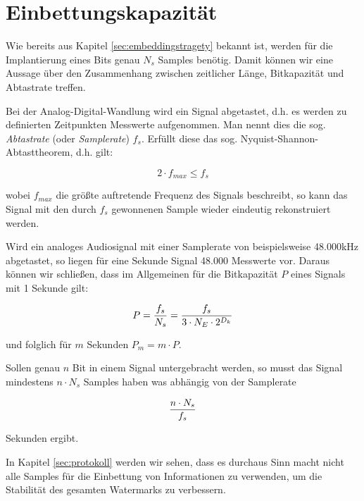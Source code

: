 \section{Einbettungskapazit\"at}
\label{sec:embedding-capacity}

Wie bereits aus Kapitel \ref{sec:embeddingstragety} bekannt ist, werden für die Implantierung eines Bits genau $N_s$ Samples benötig. Damit können wir eine Aussage über den Zusammenhang zwischen zeitlicher Länge, Bitkapazität und Abtastrate treffen. 

Bei der Analog-Digital-Wandlung wird ein Signal abgetastet, d.h. es werden zu definierten Zeitpunkten Messwerte aufgenommen. Man nennt dies die sog. \textit{Abtastrate} (oder \textit{Samplerate}) $f_s$. Erfüllt diese das sog. Nyquist-Shannon-Abtasttheorem\cite{shannon1949communication}, d.h. gilt: 

	 \begin{equation}
		 2 \cdot f_{max} \leq f_s
	 	\label{equ:abtasttheorem}
	 \end{equation}
	
wobei ${f}_{max}$ die größte auftretende Frequenz des Signals beschreibt, so kann das Signal mit den durch $f_s$ gewonnenen Sample wieder eindeutig rekonstruiert werden.

Wird ein analoges Audiosignal mit einer Samplerate von beispielsweise 48.000kHz abgetastet, so liegen für eine Sekunde Signal 48.000 Messwerte vor. Daraus können wir schließen, dass im Allgemeinen für die Bitkapazität $P$ eines Signals mit 1 Sekunde gilt: 

	 \begin{equation}
		 P = { {f}_{s} \over N_s } = { {f}_{s} \over 3 \cdot {N}_{E} \cdot 2 ^ {{D}_{k}} }
	 	\label{equ:bitcapacity_1sec}
	 \end{equation}

und folglich für $m$ Sekunden ${P}_{m} = m \cdot P$. 

Sollen genau $n$ Bit in einem Signal untergebracht werden, so musst das Signal mindestens $n \cdot {N}_{s}$ Samples haben was abhängig von der Samplerate

	 \begin{equation}
		 { n \cdot {N}_{s} \over {f}_{s} }
	 	\label{equ:bitcapacity_seconds}
	 \end{equation}
	 
Sekunden ergibt. 

In Kapitel \ref{sec:protokoll} werden wir sehen, dass es durchaus Sinn macht nicht alle Samples für die Einbettung von Informationen zu verwenden, um die Stabilität des gesamten Watermarks zu verbessern. 






